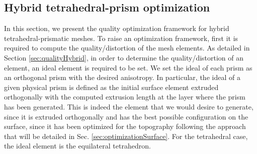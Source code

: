 \documentclass[1p]{elsarticle}
\begin{document}




\subsection{Hybrid tetrahedral-prism optimization}
\label{sec:hybridOptimization}

In this section, we present the quality optimization framework for hybrid tetrahedral-prismatic meshes.
To raise an optimization framework, first it is required to compute the quality/distortion of the mesh elements.
As detailed in Section \ref{sec:qualityHybrid}, in order to determine the quality/distortion of an element, an ideal element is required to be set.
We  set the ideal of each prism 
as an orthogonal prism with the desired anisotropy.
In particular, the ideal  of a given physical prism is defined as the initial surface element extruded orthogonally with the computed extrusion length at the layer where the prism has been generated. 
This is indeed the element that we would desire to generate, since it is extruded orthogonally and has the best possible configuration 
on the surface, since it has been optimized for the topography following the approach that will be detailed in Sec. \ref{sec:optimizationSurface}.
For the tetrahedral case, the ideal element is the equilateral tetrahedron. 
\end{document}
